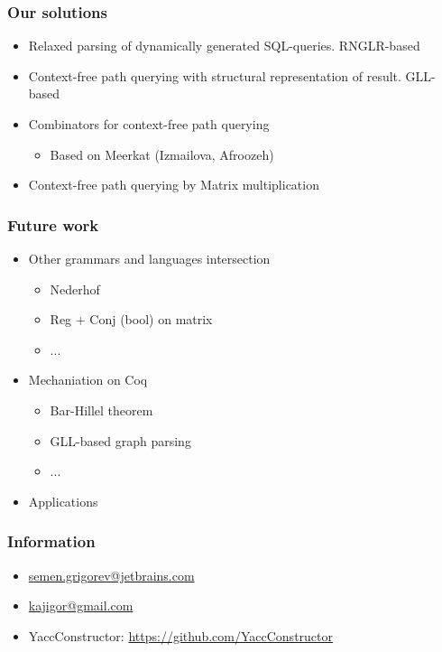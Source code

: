 \documentclass{beamer}
\begin{document}
\begin{frame}
  \transwipe[direction=90]
  \frametitle{Our solutions}
  \begin{itemize}
    \item Relaxed parsing of dynamically generated SQL-queries. RNGLR-based
    \item Context-free path querying with structural representation of result. GLL-based
    \item Combinators for context-free path querying
    \begin{itemize}
        \item Based on Meerkat (Izmailova, Afroozeh)
    \end{itemize}
    \item Context-free path querying by Matrix multiplication
  \end{itemize}
\end{frame}

\begin{frame}[fragile]
\transwipe[direction=90]
\frametitle{Future work}
\begin{itemize}
  \item Other grammars and languages intersection
  \begin{itemize}
     \item Nederhof
     \item Reg + Conj (bool) on matrix
     \item ...
  \end{itemize}
  \item Mechaniation on Coq
  \begin{itemize}
     \item Bar-Hillel theorem
     \item GLL-based graph parsing
     \item ...
  \end{itemize}
  \item Applications 
\end{itemize}
\end{frame}
            
\begin{frame}
\transwipe[direction=90]
\frametitle{Information}
\begin{itemize}
  \item \url{semen.grigorev@jetbrains.com}
  \item \url{kajigor@gmail.com}
  \item YaccConstructor: \url{https://github.com/YaccConstructor}
\end{itemize}
\end{frame}
\end{document}
